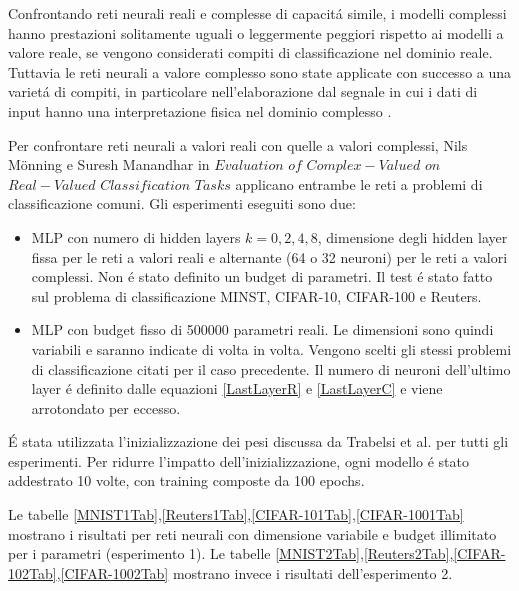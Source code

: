 \documentclass[a4paper,12pt]{report}
\begin{document}
 
 Confrontando reti neurali reali e complesse di capacit\'a simile, i modelli complessi hanno prestazioni solitamente uguali o leggermente peggiori rispetto ai modelli a valore reale, se vengono considerati compiti di classificazione nel dominio reale. 
 Tuttavia le reti neurali a valore complesso sono state applicate con successo a una variet\'a di compiti, in particolare nell'elaborazione dal segnale in cui i dati di input hanno una interpretazione fisica nel dominio complesso\cite{birx1993complex} \cite{sawada2003polar} \cite{yamaki2008singular} \cite{hirose2009complex} \cite{guberman2016complex} \cite{trabelsi2017deep}. 
 
 Per confrontare reti neurali a valori reali con quelle a valori complessi, Nils M\"onning e Suresh Manandhar in $Evaluation$ $of$ $Complex-Valued$ $on$ $Real-Valued$ $Classification$ $Tasks$  \cite{monning2018evaluation} applicano entrambe le reti a problemi di classificazione comuni. 
 Gli esperimenti eseguiti sono due:
 \begin{itemize}
  \item MLP con numero di hidden layers $k = 0, 2, 4, 8$, dimensione degli hidden layer fissa per le reti a valori reali e alternante (64 o 32 neuroni) per le reti a valori complessi. Non \'e stato definito un budget di parametri. Il test \'e stato fatto sul problema di classificazione MINST, CIFAR-10, CIFAR-100 e Reuters. 
  \item MLP con budget fisso di 500000 parametri reali. Le dimensioni sono quindi variabili e saranno indicate di volta in volta. Vengono scelti gli stessi problemi di classificazione citati per il caso precedente. Il numero di neuroni dell'ultimo layer \'e definito dalle equazioni \ref{LastLayerR} e \ref{LastLayerC} e viene arrotondato per eccesso.
 \end{itemize}
 
 \'E stata utilizzata l'inizializzazione dei pesi discussa da Trabelsi et al. \cite{trabelsi2017deep} per tutti gli esperimenti. 
 Per ridurre l'impatto dell'inizializzazione, ogni modello \'e stato addestrato 10 volte, con training composte da 100 epochs. 
  
 Le tabelle \ref{MNIST1Tab},\ref{Reuters1Tab},\ref{CIFAR-101Tab},\ref{CIFAR-1001Tab} mostrano i risultati per reti neurali con dimensione variabile e budget illimitato per i parametri (esperimento 1). 
 Le tabelle \ref{MNIST2Tab},\ref{Reuters2Tab},\ref{CIFAR-102Tab},\ref{CIFAR-1002Tab} mostrano invece i risultati dell'esperimento 2.
 
\end{document}
